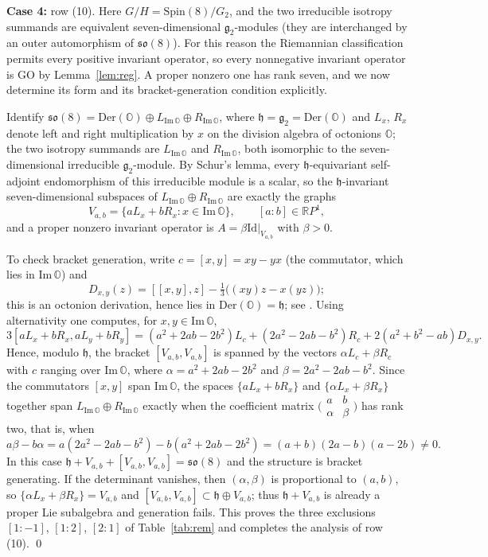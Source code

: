 \documentclass[12pt]{amsart}
\theoremstyle{plain}
\theoremstyle{definition}
\theoremstyle{remark}
\newcommand{\alg}[1]{\mathfrak{#1}}
\newcommand{\RR}{\mathbb{R}}
\newcommand{\OO}{\mathbb{O}}
\newcommand{\Idm}{\mathrm{Id}}
\begin{document}
\textbf{Case 4:} row (10).
Here $G/H=\mathrm{Spin}(8)/G_2$, and the two irreducible isotropy summands are equivalent
seven-dimensional $\alg{g}_2$-modules (they are interchanged by an outer automorphism of
$\alg{so}(8)$). For this reason the Riemannian classification \cite[Table~1]{ChenNN} permits every
positive invariant operator, so every nonnegative invariant operator is GO by Lemma~\ref{lem:reg}.
A proper nonzero one has rank seven, and we now determine its form and its bracket-generation
condition explicitly.

Identify $\alg{so}(8)=\mathrm{Der}(\OO)\oplus L_{\mathrm{Im}\,\OO}\oplus R_{\mathrm{Im}\,\OO}$, where
$\alg{h}=\alg{g}_2=\mathrm{Der}(\OO)$ and $L_x$, $R_x$ denote left and right multiplication by $x$ on
the division algebra of octonions $\OO$; the two isotropy summands are $L_{\mathrm{Im}\,\OO}$ and
$R_{\mathrm{Im}\,\OO}$, both isomorphic to the seven-dimensional irreducible $\alg{g}_2$-module.
By Schur's lemma, every $\alg{h}$-equivariant self-adjoint endomorphism of this irreducible module
is a scalar, so the $\alg{h}$-invariant seven-dimensional subspaces of
$L_{\mathrm{Im}\,\OO}\oplus R_{\mathrm{Im}\,\OO}$ are exactly the graphs
\[ V_{a,b}=\{aL_x+bR_x:x\in\mathrm{Im}\,\OO\},\qquad [a:b]\in\RR P^1, \]
and a proper nonzero invariant operator is $A=\beta\Idm|_{V_{a,b}}$ with $\beta>0$.

To check bracket generation, write $c=[x,y]=xy-yx$ (the commutator, which lies in
$\mathrm{Im}\,\OO$) and
\[ D_{x,y}(z)=[[x,y],z]-\tfrac13\big((xy)z-x(yz)\big); \]
this is an octonion derivation, hence lies in $\mathrm{Der}(\OO)=\alg{h}$; see \cite[Sec.~4.1]{Baez}.
Using alternativity one computes, for $x,y\in\mathrm{Im}\,\OO$,
\[ 3[aL_x+bR_x,aL_y+bR_y]=(a^2+2ab-2b^2)L_c+(2a^2-2ab-b^2)R_c+2(a^2+b^2-ab)D_{x,y}. \]
Hence, modulo $\alg{h}$, the bracket $[V_{a,b},V_{a,b}]$ is spanned by the vectors
$\alpha L_c+\beta R_c$ with $c$ ranging over $\mathrm{Im}\,\OO$, where $\alpha=a^2+2ab-2b^2$ and
$\beta=2a^2-2ab-b^2$. Since the commutators $[x,y]$ span $\mathrm{Im}\,\OO$, the spaces
$\{aL_x+bR_x\}$ and $\{\alpha L_x+\beta R_x\}$ together span
$L_{\mathrm{Im}\,\OO}\oplus R_{\mathrm{Im}\,\OO}$ exactly when the coefficient matrix
$\bigl(\begin{smallmatrix} a & b\\ \alpha & \beta \end{smallmatrix}\bigr)$ has rank two, that is,
when
\[ a\beta-b\alpha=a(2a^2-2ab-b^2)-b(a^2+2ab-2b^2)=(a+b)(2a-b)(a-2b)\neq0. \]
In this case $\alg{h}+V_{a,b}+[V_{a,b},V_{a,b}]=\alg{so}(8)$ and the structure is bracket
generating. If the determinant vanishes, then $(\alpha,\beta)$ is proportional to $(a,b)$, so
$\{\alpha L_x+\beta R_x\}=V_{a,b}$ and $[V_{a,b},V_{a,b}]\subset\alg{h}\oplus V_{a,b}$; thus
$\alg{h}+V_{a,b}$ is already a proper Lie subalgebra and generation fails. This proves the three
exclusions $[1:-1]$, $[1:2]$, $[2:1]$ of Table~\ref{tab:rem} and completes the analysis of row (10).
\qed
\end{document}
